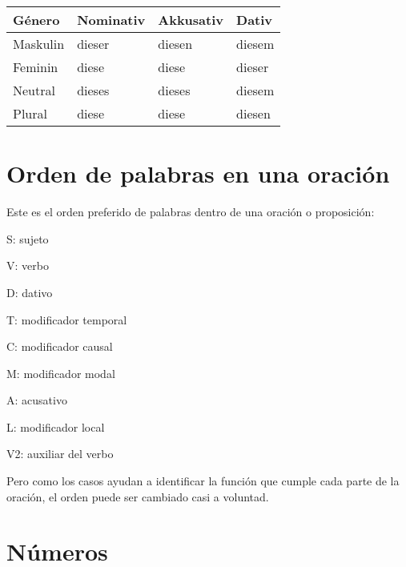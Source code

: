 \begin{tabular}{| l | l | l | l |}
\hline
\textbf{Género} & \textbf{Nominativ} & \textbf{Akkusativ} & \textbf{Dativ}\\
\hline
Maskulin & dieser & diesen & diesem  \\
Feminin  & diese  & diese  & dieser \\
Neutral  & dieses & dieses & diesem \\
Plural   & diese  & diese  & diesen \\
\hline
\end{tabular}

\section{Orden de palabras en una oración}
Este es el orden preferido de palabras dentro de una oración o proposición:
\begin{myitemize}
\item S: sujeto
\item V: verbo
\item D: dativo
\item T: modificador temporal
\item C: modificador causal
\item M: modificador modal
\item A: acusativo
\item L: modificador local
\item V2: auxiliar del verbo
\end{myitemize}

Pero como los casos ayudan a identificar la función que cumple cada parte de la oración, el orden puede ser cambiado casi a voluntad.

\section{Números}
